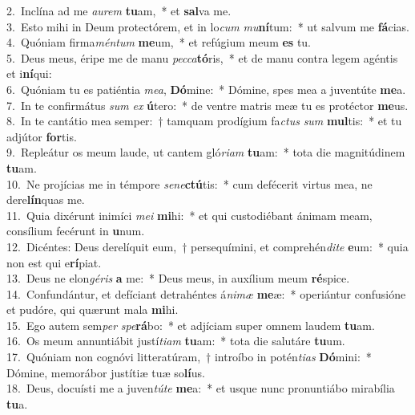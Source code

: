 {2.~}Inclína ad me \textit{au}\textit{rem} \textbf{tu}am,~* et \textbf{sal}va me.\\
{3.~}Esto mihi in Deum protectórem, et in lo\textit{cum} \textit{mu}\textbf{ní}tum:~* ut salvum me \textbf{fá}cias.\\
{4.~}Quóniam firma\textit{mén}\textit{tum} \textbf{me}um,~* et refúgium meum \textbf{es} tu.\\
{5.~}Deus meus, éripe me de manu \textit{pec}\textit{ca}\textbf{tó}ris,~* et de manu contra legem agéntis et i\textbf{ní}qui:\\
{6.~}Quóniam tu es patiéntia \textit{me}\textit{a}, \textbf{Dó}mine:~* Dómine, spes mea a juventúte \textbf{me}a.\\
{7.~}In te confirmátus \textit{sum} \textit{ex} \textbf{ú}tero:~* de ventre matris meæ tu es protéctor \textbf{me}us.\\
{8.~}In te cantátio mea semper:~† tamquam prodígium fa\textit{ctus} \textit{sum} \textbf{mul}tis:~* et tu adjútor \textbf{for}tis.\\
{9.~}Repleátur os meum laude, ut cantem gló\textit{ri}\textit{am} \textbf{tu}am:~* tota die magnitúdinem \textbf{tu}am.\\
{10.~}Ne projícias me in témpore \textit{se}\textit{ne}\textbf{ctú}tis:~* cum defécerit virtus mea, ne dere\textbf{lín}quas me.\\
{11.~}Quia dixérunt inimíci \textit{me}\textit{i} \textbf{mi}hi:~* et qui custodiébant ánimam meam, consílium fecérunt in \textbf{u}num.\\
{12.~}Dicéntes: Deus derelíquit eum,~† persequímini, et comprehén\textit{di}\textit{te} \textbf{e}um:~* quia non est qui e\textbf{rí}piat.\\
{13.~}Deus ne elon\textit{gé}\textit{ris} \textbf{a} me:~* Deus meus, in auxílium meum \textbf{ré}spice.\\
{14.~}Confundántur, et defíciant detrahéntes á\textit{ni}\textit{mæ} \textbf{me}æ:~* operiántur confusióne et pudóre, qui quærunt mala \textbf{mi}hi.\\
{15.~}Ego autem sem\textit{per} \textit{spe}\textbf{rá}bo:~* et adjíciam super omnem laudem \textbf{tu}am.\\
{16.~}Os meum annuntiábit justí\textit{ti}\textit{am} \textbf{tu}am:~* tota die salutáre \textbf{tu}um.\\
{17.~}Quóniam non cognóvi litteratúram,~† introíbo in potén\textit{ti}\textit{as} \textbf{Dó}mini:~* Dómine, memorábor justítiæ tuæ so\textbf{lí}us.\\
{18.~}Deus, docuísti me a juven\textit{tú}\textit{te} \textbf{me}a:~* et usque nunc pronuntiábo mirabília \textbf{tu}a.\\
